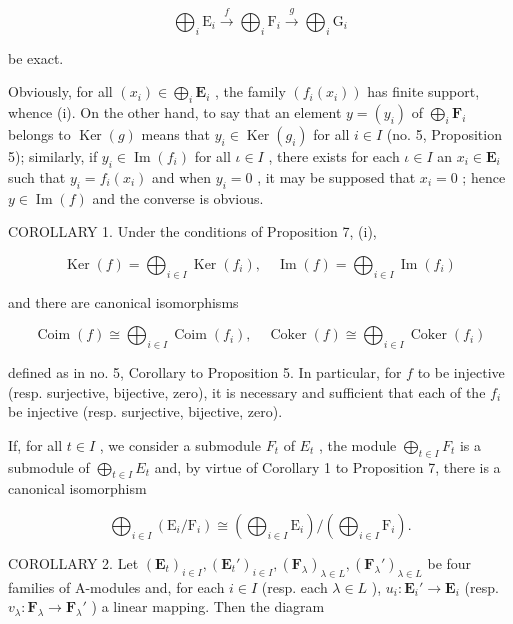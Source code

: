 \[
\bigoplus_ {i} \mathrm{E} _ {i} \xrightarrow {f} \bigoplus_ {i} \mathrm{F} _ {i} \xrightarrow {g} \bigoplus_ {i} \mathrm{G} _ {i}
\]

be exact.

Obviously, for all \((x_{i})\in \bigoplus_{i}\mathbf{E}_{i}\) , the family \((f_{i}(x_{i}))\) has finite support, whence (i). On the other hand, to say that an element \(y = (y_{i})\) of \(\bigoplus_{i}\mathbf{F}_{i}\) belongs to \(\operatorname {Ker}(g)\) means that \(y_{i}\in \operatorname {Ker}(g_{i})\) for all \(i \in I\) (no. 5, Proposition 5); similarly, if \(y_{i}\in \operatorname {Im}(f_{i})\) for all \(\iota \in I\) , there exists for each \(\iota \in I\) an \(x_{i}\in \mathbf{E}_{i}\) such that \(y_{i} = f_{i}(x_{i})\) and when \(y_{i} = 0\) , it may be supposed that \(x_{i} = 0\) ; hence \(y\in \operatorname {Im}(f)\) and the converse is obvious.

COROLLARY 1. Under the conditions of Proposition 7, (i),

\[
\operatorname{Ker} (f) = \bigoplus_ {i \in I} \operatorname{Ker} (f _ {i}), \quad \operatorname{Im} (f) = \bigoplus_ {i \in I} \operatorname{Im} (f _ {i})\tag{25}
\]

and there are canonical isomorphisms

\[
\operatorname{Coim} (f) \cong \bigoplus_ {i \in I} \operatorname{Coim} (f _ {i}), \quad \operatorname{Coker} (f) \cong \bigoplus_ {i \in I} \operatorname{Coker} (f _ {i})
\]

defined as in no. 5, Corollary to Proposition 5. In particular, for \(f\) to be injective (resp. surjective, bijective, zero), it is necessary and sufficient that each of the \(f_i\) be injective (resp. surjective, bijective, zero).

If, for all \(t \in I\) , we consider a submodule \(F_t\) of \(E_t\) , the module \(\bigoplus_{t \in I} F_t\) is a submodule of \(\bigoplus_{t \in I} E_t\) and, by virtue of Corollary 1 to Proposition 7, there is a canonical isomorphism

\[
\bigoplus_ {i \in I} \left(\mathrm{E} _ {i} / \mathrm{F} _ {i}\right)\cong \left(\bigoplus_ {i \in I} \mathrm{E} _ {i}\right) / \left(\bigoplus_ {i \in I} \mathrm{F} _ {i}\right).\tag{26}
\]

COROLLARY 2. Let \((\mathbf{E}_t)_{i \in I}, (\mathbf{E}_t')_{i \in I}, (\mathbf{F}_\lambda)_{\lambda \in L}, (\mathbf{F}_\lambda')_{\lambda \in L}\) be four families of A-modules and, for each \(i \in I\) (resp. each \(\lambda \in L\) ), \(u_i: \mathbf{E}_i' \to \mathbf{E}_i\) (resp. \(v_\lambda: \mathbf{F}_\lambda \to \mathbf{F}_\lambda'\) ) a linear mapping. Then the diagram

